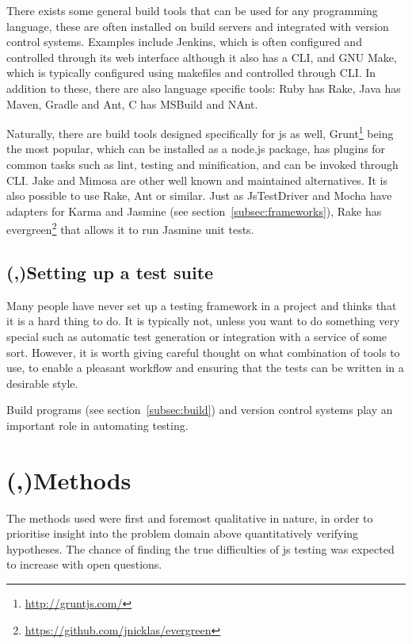 \documentclass[11pt]{article}
\begin{document}
There exists some general build tools that can be used for any programming language, these are often installed on build servers and integrated with version control systems. Examples include Jenkins, which is often configured and controlled through its web interface although it also has a CLI, and GNU Make, which is typically configured using makefiles and controlled through CLI. In addition to these, there are also language specific tools: Ruby has Rake, Java has Maven, Gradle and Ant, C\nolinebreak\hspace{-.05em}\raisebox{.3ex}{\scriptsize\bf \#} has MSBuild and NAnt.

Naturally, there are build tools designed specifically for \gls{js} as well, Grunt\footnote{\url{http://gruntjs.com/}} being the most popular, which can be installed as a node.js package, has plugins for common tasks such as lint, testing and minification, and can be invoked through CLI. \cite[question~52]{Edelstam} Jake and Mimosa are other well known and maintained alternatives. It is also possible to use Rake, Ant or similar. Just as JsTestDriver and Mocha have adapters for Karma and Jasmine (see section~\ref{subsec:frameworks}), Rake has evergreen\footnote{\url{https://github.com/jnicklas/evergreen}} that allows it to run Jasmine unit tests. \cite{BuildTools}\cite[question~6]{Ahnve}

\subsection{(,)Setting up a test suite}

Many people have never set up a testing framework in a project and thinks that it is a hard thing to do. It is typically not, unless you want to do something very special such as automatic test generation or integration with a service of some sort. However, it is worth giving careful thought on what combination of tools to use, to enable a pleasant workflow and ensuring that the tests can be written in a desirable style.

Build programs (see section~\ref{subsec:build}) and version control systems play an important role in automating testing.


\section{(,)Methods}

The methods used were first and foremost qualitative in nature, in order to prioritise insight into the problem domain above quantitatively verifying hypotheses. The chance of finding the true difficulties of \gls{js} testing was expected to increase with open questions.
\end{document}
